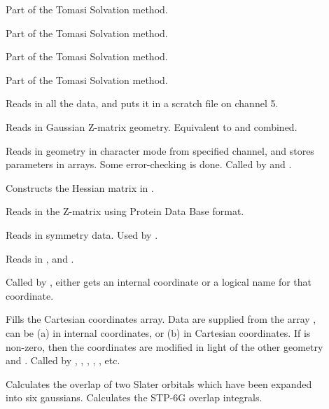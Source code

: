 \begin{description}
\item[] Part of the Tomasi Solvation method.

\item[] Part of the Tomasi Solvation method.

\item[] Part of the Tomasi Solvation method.

\item[] Part of the Tomasi Solvation method.

\item[] Reads in all the data, and puts it in a scratch file on
channel 5.

\item[] Reads in Gaussian Z-matrix geometry. Equivalent to
 and  combined.

\item[] Reads in geometry in character mode from specified
channel, and stores parameters in arrays. Some error-checking  is done. Called
by  and .

\item[] Constructs the Hessian matrix in .

\item[] Reads in the Z-matrix using Protein Data Base format.

\item[] Reads in symmetry data. Used by .

\item[] Reads in ,  and .

\item[] Called by ,  either gets an
internal coordinate or a logical name for that coordinate.

\item[] Fills the Cartesian coordinates array. Data are 
supplied from the array ,  can be (a) in internal 
coordinates, or (b) in Cartesian coordinates. If  is  non-zero, then
the coordinates are modified in light of the  other geometry and .
Called by ,  , , , 
, etc.

\item[] Calculates the overlap of two Slater orbitals which have
been expanded into six gaussians.  Calculates the STP-6G overlap integrals.


\end{description}
